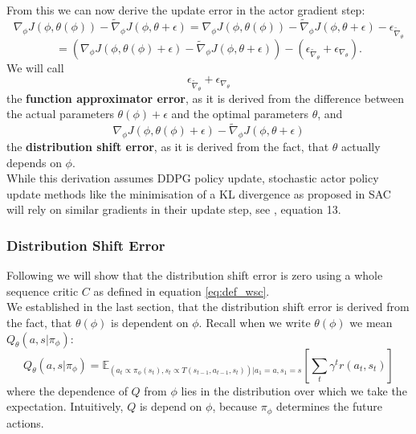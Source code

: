 From this we can now derive the update error in the actor gradient step:
\begin{equation}
    \label{equation:general_update_error}
    \nabla_{\phi} J(\phi, \theta(\phi)) - \widetilde{\nabla}_\phi J(\phi, \theta + \epsilon) = \nabla_{\phi} J(\phi, \theta(\phi)) - \widetilde{\nabla}_\phi J(\phi, \theta + \epsilon) - \epsilon_{\widetilde{\nabla}_{\theta}}
\end{equation}
\begin{equation*}
    = \left(\nabla_{\phi} J(\phi, \theta(\phi) + \epsilon) - \widetilde{\nabla}_\phi J(\phi, \theta + \epsilon)\right) - \left( \epsilon_{\widetilde{\nabla}_{\theta}} + \epsilon_{\nabla_{\theta}} \right).
\end{equation*}
We will call 
\begin{equation}
    \label{eq:def_func_app_err}
     \epsilon_{\widetilde{\nabla}_{\theta}} + \epsilon_{\nabla_{\theta}}
\end{equation}
the \textbf{function approximator error}, as it is derived from the difference between 
the actual parameters $\theta(\phi) +\epsilon$ and the optimal parameters $\theta$, and \\
\begin{equation}
    \label{eq:def_di_sh_err}
    \nabla_{\phi} J(\phi, \theta(\phi) + \epsilon) - \widetilde{\nabla}_\phi J(\phi, \theta + \epsilon)
\end{equation}
the \textbf{distribution shift error}, as it is derived from the fact, that $\theta$ actually depends on $\phi$. \\
While this derivation assumes DDPG policy update, stochastic actor policy update methods like the minimisation of a KL divergence as 
proposed in SAC will rely on similar gradients in their update step, see \cite{haarnoja2018soft}, equation 13.

\subsubsection{Distribution Shift Error}
\label{dist_shift_error_section}
Following we will show that the distribution shift error is zero using a whole sequence critic $C$ as defined in equation \ref{eq:def_wsc}. \\ 

We established in the last section, that the distribution shift error is derived from the fact, that $\theta(\phi)$ is dependent on $\phi$. 
Recall when we write $\theta(\phi)$ we mean $Q_{\theta}(a,s|\pi_{\phi})$:
\begin{equation*}
    Q_{\theta}(a,s|\pi_{\phi}) = \mathbb{E}_{(a_t \propto \pi_{\phi}(s_t), s_t \propto T(s_{t-1}, a_{t-1}, s_t))|a_1=a, s_1=s}\left[\sum_t \gamma^t r(a_t, s_t)\right]
\end{equation*}
where the dependence of $Q$ from $\phi$ lies in the distribution over which we take the expectation. Intuitively, $Q$ is depend on $\phi$, because $\pi_{\phi}$ determines the 
future actions.\\ 

